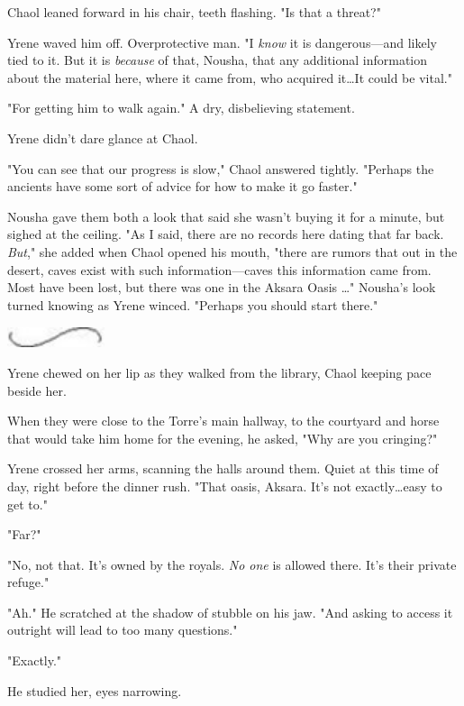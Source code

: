 Chaol leaned forward in his chair, teeth flashing.
"Is that a threat?"

Yrene waved him off.
Overprotective man.
"I \emph{know} it is dangerous---and likely tied to it.
But it is \emph{because} of that, Nousha, that any additional information about the material here, where it came from, who acquired it\ldots It could be vital."

"For getting him to walk again."
A dry, disbelieving statement.

Yrene didn't dare glance at Chaol.

"You can see that our progress is slow," Chaol answered tightly.
"Perhaps the ancients have some sort of advice for how to make it go faster."

Nousha gave them both a look that said she wasn't buying it for a minute, but sighed at the ceiling.
"As I said, there are no records here dating that far back.
\emph{But}," she added when Chaol opened his mouth, "there are rumors that out in the desert, caves exist with such information---caves this information came from.
Most have been lost, but there was one in the Aksara Oasis \ldots" Nousha's look turned knowing as Yrene winced.
"Perhaps you should start there."

\begin{center}
	\includegraphics[width=1.12in,height=0.24in]{images/seperator}
\end{center}

Yrene chewed on her lip as they walked from the library, Chaol keeping pace beside her.

When they were close to the Torre's main hallway, to the courtyard and horse that would take him home for the evening, he asked, "Why are you cringing?"

Yrene crossed her arms, scanning the halls around them.
Quiet at this time of day, right before the dinner rush.
"That oasis, Aksara.
It's not exactly\ldots easy to get to."

"Far?"

"No, not that.
It's owned by the royals.
\emph{No one} is allowed there.
It's their private refuge."

"Ah."
He scratched at the shadow of stubble on his jaw.
"And asking to access it outright will lead to too many questions."

"Exactly."

He studied her, eyes narrowing.

